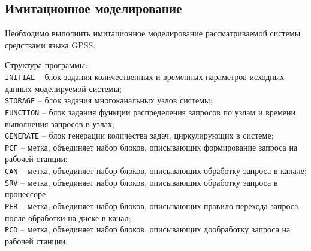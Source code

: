 \newpage

\subsection{Имитационное моделирование}

Необходимо выполнить имитационное моделирование рассматриваемой системы средствами языка GPSS.\par\bigskip

Структура программы:\\
\verb|INITIAL| -- блок задания количественных и временных параметров исходных данных моделируемой системы;\\
\verb|STORAGE| -- блок задания многоканальных узлов системы;\\
\verb|FUNCTION| -- блок задания функции распределения запросов по узлам и времени выполнения запросов в узлах;\\
\verb|GENERATE| -- блок генерации количества задач, циркулирующих в системе;\\
\verb|PCF| -- метка, объединяет набор блоков, описывающих формирование запроса на рабочей станции;\\
\verb|CAN| -- метка, объединяет набор блоков, описывающих обработку эапроса в канале;\\
\verb|SRV| -- метка, объединяет набор блоков, описывающих обработку эапроса в процессоре;\\
\verb|PER| -- метка, объединяет набор блоков, описывающих правило перехода запроса после обработки на диске в канал;\\
\verb|PCD| -- метка, объединяет набор блоков, описывающих дообработку запроса на рабочей станции.\par\bigskip

